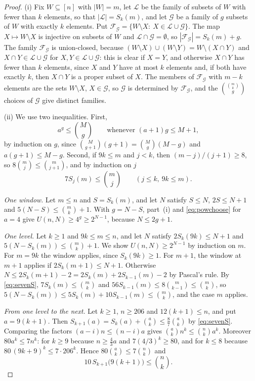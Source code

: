 \documentclass[11pt,reqno]{amsart}
\numberwithin{equation}{section}
\theoremstyle{plain}
\theoremstyle{definition}
\theoremstyle{remark}
\newcommand{\cF}{\mathcal{F}}
\newcommand{\cL}{\mathcal{L}}
\newcommand{\cG}{\mathcal{G}}
\begin{document}
\begin{proof}
(i) Fix $W\subseteq[n]$ with $|W|=m$, let $\cL$ be the family of subsets
of $W$ with fewer than $k$ elements, so that $|\cL|=S_k(m)$, and let $\cG$
be a family of $g$ subsets of $W$ with exactly $k$ elements. Put
$\cF_\cG=\{W\setminus X:\ X\in\cL\cup\cG\}$. The map $X\mapsto
W\setminus X$ is injective on subsets of $W$ and $\cL\cap\cG=\emptyset$,
so $|\cF_\cG|=S_k(m)+g$. The family $\cF_\cG$ is union-closed, because
$(W\setminus X)\cup(W\setminus Y)=W\setminus(X\cap Y)$ and $X\cap Y\in
\cL\cup\cG$ for $X,Y\in\cL\cup\cG$: this is clear if $X=Y$, and
otherwise $X\cap Y$ has fewer than $k$ elements, since $X$ and $Y$ have at
most $k$ elements and, if both have exactly $k$, then $X\cap Y$ is a
proper subset of $X$. The members of $\cF_\cG$ with $m-k$ elements are the
sets $W\setminus X$, $X\in\cG$, so $\cG$ is determined by $\cF_\cG$, and
the $\binom{\binom mk}{g}$ choices of $\cG$ give distinct families.

(ii) We use two inequalities. First,
\begin{equation}
\label{eq:powchoose}
a^{g}\le\binom Mg\qquad\text{whenever }(a+1)g\le M+1,
\end{equation}
by induction on $g$, since $\binom M{g+1}(g+1)=\binom Mg(M-g)$ and
$a(g+1)\le M-g$. Second, if $9k\le m$ and $j<k$, then
$(m-j)/(j+1)\ge8$, so $8\binom mj\le\binom m{j+1}$, and by induction on
$j$
\begin{equation}
\label{eq:sevenS}
7S_j(m)\le\binom mj\qquad(j\le k,\ 9k\le m).
\end{equation}

\emph{One window.} Let $m\le n$ and $S=S_k(m)$, and let $N$ satisfy
$S\le N$, $2S\le N+1$ and $5(N-S)\le\binom mk+1$. With $g=N-S$, part~(i)
and \eqref{eq:powchoose} for $a=4$ give $U(n,N)\ge4^{g}\ge2^{N-1}$,
because $N\le2g+1$.

\emph{One level.} Let $k\ge1$ and $9k\le m\le n$, and let $N$ satisfy
$2S_k(9k)\le N+1$ and $5(N-S_k(m))\le\binom mk+1$. We show
$U(n,N)\ge2^{N-1}$ by induction on $m$. For $m=9k$ the window applies,
since $S_k(9k)\ge1$. For $m+1$, the window at $m+1$ applies if
$2S_k(m+1)\le N+1$. Otherwise $N\le2S_k(m+1)-2=2S_k(m)+2S_{k-1}(m)-2$ by
Pascal's rule. By \eqref{eq:sevenS}, $7S_k(m)\le\binom mk$ and
$56S_{k-1}(m)\le8\binom m{k-1}\le\binom mk$, so
$5(N-S_k(m))\le5S_k(m)+10S_{k-1}(m)\le\binom mk$, and the case $m$
applies.

\emph{From one level to the next.} Let $k\ge1$, $n\ge206$ and
$12(k+1)\le n$, and put $a=9(k+1)$. Then
$S_{k+1}(a)=S_k(a)+\binom ak\le\frac87\binom ak$ by \eqref{eq:sevenS}.
Comparing the factors $(a-i)n\le(n-i)a$ gives $\binom ak n^{k}\le
\binom nk a^{k}$. Moreover $80a^{k}\le7n^{k}$: for $k\ge9$ because
$n\ge\frac43a$ and $7(4/3)^{k}\ge80$, and for $k\le8$ because
$80\,(9k+9)^{k}\le7\cdot206^{k}$. Hence $80\binom ak\le7\binom nk$ and
\begin{equation}
\label{eq:crosslevel}
10\,S_{k+1}\bigl(9(k+1)\bigr)\le\binom nk .
\end{equation}


\end{proof}
\end{document}
